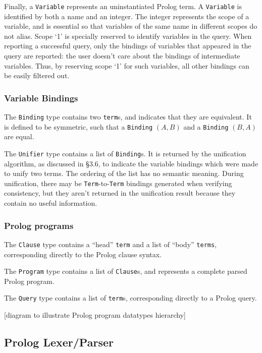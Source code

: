 \documentclass[12pt]{article}
\begin{document}
Finally, a \verb|Variable| represents an uninstantiated Prolog term. 
A \verb|Variable| is identified by both a name and an integer. 
The integer represents the scope of a variable, and is essential so that variables of the same name in different scopes do not alias. 
Scope `1' is specially reserved to identify variables in the query. 
When reporting a successful query, only the bindings of variables that appeared in the query are reported: the user doesn't care about the bindings of intermediate variables.
Thus, by reserving scope `1' for such variables, all other bindings can be easily filtered out.

\subsubsection{Variable Bindings}

The \verb|Binding| type contains two \verb|term|s, and indicates that they are equivalent. 
It is defined to be symmetric, such that a \verb|Binding| $(A,B)$ and a \verb|Binding| $(B,A)$ are equal.

The \verb|Unifier| type contains a list of \verb|Binding|s. 
It is returned by the unification algorithm, as discussed in \S3.6, to indicate the variable bindings which were made to unify two terms. 
The ordering of the list has no semantic meaning.
During unification, there may be \verb|Term|-to-\verb|Term| bindings generated when verifying consistency, but they aren't returned in the unification result because they contain no useful information.

\subsubsection{Prolog programs}

The \verb|Clause| type contains a ``head'' \verb|term| and a list of ``body'' \verb|terms|, corresponding directly to the Prolog clause syntax.

The \verb|Program| type contains a list of \verb|Clause|s, and represents a complete parsed Prolog program.

The \verb|Query| type contains a list of \verb|term|s, corresponding directly to a Prolog query.

[diagram to illustrate Prolog program datatypes hierarchy]

\subsection{Prolog Lexer/Parser}
\end{document}
